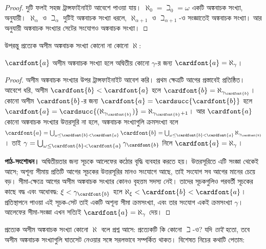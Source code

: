 \documentclass[../../../include/open-logic-section]{subfiles}
\begin{document}
\begin{proof}
দুটি ফলই সহজ ট্রান্সফাইনাইট আবেশে পাওয়া যায়।
$\aleph_0=\beth_0=\omega$ একটি অঙ্কবাচক সংখ্যা,
 অনুযায়ী।
$\aleph_\alpha$ ও $\beth_\alpha$ দুটিই অঙ্কবাচক সংখ্যা
ধরলে, $\aleph_{\alpha+1}$ ও $\beth_{\alpha+1}$-ও
সংজ্ঞাতেই অঙ্কবাচক সংখ্যা। আর
অনুযায়ী অঙ্কবাচক সংখ্যার সেটের সংযোগও অঙ্কবাচক সংখ্যা।
\end{proof}
\noindent
উপরন্তু প্রত্যেক অসীম অঙ্কবাচক সংখ্যা কোনো না কোনো
$\aleph$:

\begin{prop}
$\cardfont{a}$ অসীম অঙ্কবাচক সংখ্যা হলে অদ্বিতীয়
কোনো $\gamma$-র জন্য
$\cardfont{a}=\aleph_\gamma$।
\end{prop}

\begin{proof}
অসীম অঙ্কবাচক সংখ্যার উপর ট্রান্সফাইনাইট আবেশ করি।
প্রথম ক্ষেত্রটি আগের প্রস্তাবেই প্রতিষ্ঠিত। আবেশে ধরি,
অসীম $\cardfont{b}<\cardfont{a}$ হলে
$\cardfont{b}=\aleph_{\gamma_\cardfont{b}}$।
কোনো অসীম $\cardfont{b}$-র জন্য
$\cardfont{a}=\cardsucc{\cardfont{b}}$ হলে
$\cardfont{a}=\cardsucc{(\aleph_{\gamma_\cardfont{b}})}=
\aleph_{\gamma_\cardfont{b}+1}$।
আর $\cardfont{a}$ কোনো অঙ্কবাচক সংখ্যার উত্তরসূরি
না হলে, অঙ্কবাচক সংখ্যাগুলি ক্রমসংখ্যা বলে
$\cardfont{a}=\bigcup_{\omega\leq\cardfont{b}<\cardfont{a}}\cardfont{b}=
\bigcup_{\omega\leq\cardfont{b}<\cardfont{a}}{\aleph_{\gamma_\cardfont{b}}}$।
তাই $\gamma=
\bigcup_{\omega\leq\cardfont{b}<\cardfont{a}}\gamma_\cardfont{b}$
নিলে $\cardfont{a}=\aleph_\gamma$।
\par\noindent\textbf{পাঠ-সংশোধন।} অদ্বিতীয়তার জন্য সূচকে আলেফের কঠোর বৃদ্ধি ব্যবহার করতে হয়।
উত্তরসূরিতে এটি সংজ্ঞা থেকেই আসে; অশূন্য সীমায় প্রতিটি আগের
সূচকের উত্তরসূরির মানও সংযোগে আছে, তাই সংযোগ সব আগের মানের
চেয়ে বড়। সীমা-ক্ষেত্রে আগের অসীম অঙ্কবাচক সংখ্যার কোনও
বৃহত্তম সদস্য নেই। তাদের সূচকগুলিও পরবর্তী সূচকের কাছে বদ্ধ এবং
অধোবদ্ধ: $\xi<\gamma_{\cardfont{b}}$ হলে
$\aleph_\xi<\cardfont{b}<\cardfont{a}$। প্রতিস্থাপনে পাওয়া
এই সূচক-সেট তাই একটি অশূন্য সীমা ক্রমসংখ্যা, এবং তার সংযোগ
একই ক্রমসংখ্যা $\gamma$। আলেফের সীমা-সংজ্ঞা এখন সত্যিই
$\cardfont{a}=\aleph_\gamma$ দেয়।
\end{proof}

প্রত্যেক অসীম অঙ্কবাচক সংখ্যা কোনো $\aleph$ বলে
প্রশ্ন আসে: প্রত্যেকটি কি কোনো $\beth$-ও? যদি
\emph{তাই} হতো, তবে অসীম অঙ্কবাচক সংখ্যাগুলি
ঘাতসেট নেওয়ার সঙ্গে সরলভাবে সম্পর্কিত থাকত।
বিশেষত নিচের কথাটি পেতাম:
\end{document}
